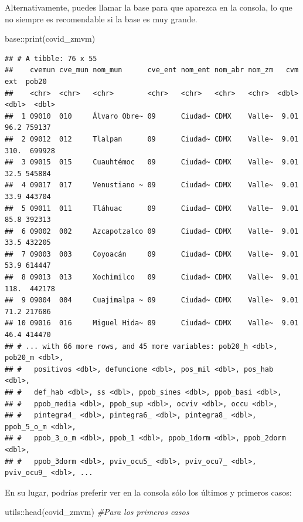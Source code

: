 \documentclass[
  11pt,
  oneside]{book}
\newenvironment{Shaded}{\begin{snugshade}}{\end{snugshade}}
\newcommand{\CommentTok}[1]{\textcolor[rgb]{0.56,0.35,0.01}{\textit{#1}}}
\newcommand{\FunctionTok}[1]{\textcolor[rgb]{0.00,0.00,0.00}{#1}}
\newcommand{\NormalTok}[1]{#1}
\newcommand{\SpecialCharTok}[1]{\textcolor[rgb]{0.00,0.00,0.00}{#1}}
\begin{document}
Alternativamente, puedes llamar la base para que aparezca en la consola, lo que no siempre es recomendable si la base es muy grande.

\begin{Shaded}
\begin{Highlighting}[]
\NormalTok{base}\SpecialCharTok{::}\FunctionTok{print}\NormalTok{(covid\_zmvm)}
\end{Highlighting}
\end{Shaded}

\begin{verbatim}
## # A tibble: 76 x 55
##    cvemun cve_mun nom_mun      cve_ent nom_ent nom_abr nom_zm   cvm   ext  pob20
##    <chr>  <chr>   <chr>        <chr>   <chr>   <chr>   <chr>  <dbl> <dbl>  <dbl>
##  1 09010  010     Álvaro Obre~ 09      Ciudad~ CDMX    Valle~  9.01  96.2 759137
##  2 09012  012     Tlalpan      09      Ciudad~ CDMX    Valle~  9.01 310.  699928
##  3 09015  015     Cuauhtémoc   09      Ciudad~ CDMX    Valle~  9.01  32.5 545884
##  4 09017  017     Venustiano ~ 09      Ciudad~ CDMX    Valle~  9.01  33.9 443704
##  5 09011  011     Tláhuac      09      Ciudad~ CDMX    Valle~  9.01  85.8 392313
##  6 09002  002     Azcapotzalco 09      Ciudad~ CDMX    Valle~  9.01  33.5 432205
##  7 09003  003     Coyoacán     09      Ciudad~ CDMX    Valle~  9.01  53.9 614447
##  8 09013  013     Xochimilco   09      Ciudad~ CDMX    Valle~  9.01 118.  442178
##  9 09004  004     Cuajimalpa ~ 09      Ciudad~ CDMX    Valle~  9.01  71.2 217686
## 10 09016  016     Miguel Hida~ 09      Ciudad~ CDMX    Valle~  9.01  46.4 414470
## # ... with 66 more rows, and 45 more variables: pob20_h <dbl>, pob20_m <dbl>,
## #   positivos <dbl>, defuncione <dbl>, pos_mil <dbl>, pos_hab <dbl>,
## #   def_hab <dbl>, ss <dbl>, ppob_sines <dbl>, ppob_basi <dbl>,
## #   ppob_media <dbl>, ppob_sup <dbl>, ocviv <dbl>, occu <dbl>,
## #   pintegra4_ <dbl>, pintegra6_ <dbl>, pintegra8_ <dbl>, ppob_5_o_m <dbl>,
## #   ppob_3_o_m <dbl>, ppob_1 <dbl>, ppob_1dorm <dbl>, ppob_2dorm <dbl>,
## #   ppob_3dorm <dbl>, pviv_ocu5_ <dbl>, pviv_ocu7_ <dbl>, pviv_ocu9_ <dbl>, ...
\end{verbatim}

En su lugar, podrías preferir ver en la consola sólo los últimos y primeros casos:

\begin{Shaded}
\begin{Highlighting}[]
\NormalTok{utils}\SpecialCharTok{::}\FunctionTok{head}\NormalTok{(covid\_zmvm) }\CommentTok{\#Para los primeros casos}
\end{Highlighting}
\end{Shaded}
\end{document}
